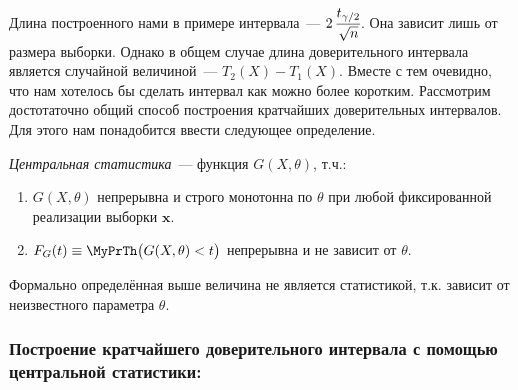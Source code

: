 Длина построенного нами в примере интервала~--- $2\, \cfrac{t_{\gamma / 2}}{\sqrt{n}}$.
Она зависит лишь от размера выборки.
Однако в общем случае длина доверительного интервала является случайной величиной~--- $T_2(X) - T_1(X)$.
Вместе с тем очевидно, что нам хотелось бы сделать интервал как можно более коротким.
Рассмотрим достотаточно общий способ построения кратчайших доверительных интервалов.
Для этого нам понадобится ввести следующее определение.

\begin{defn}
    \textit{Центральная статистика}~--- функция $G(X,\theta)$, т.ч.:
    \begin{enumerate}
        \item $G(X,\theta)$ непрерывна и строго монотонна по $\theta$ при любой фиксированной реализации выборки $\boldsymbol{x}$. 
        \item $F_G (t) \equiv \MyPrTh \bigl(G(X, \theta) < t\bigr)$ непрерывна и не зависит от $\theta$.
    \end{enumerate}
\end{defn}

\begin{rmrk}
    Формально определённая выше величина не является статистикой, т.к. зависит от неизвестного параметра $\theta$.
\end{rmrk}

\subsubsection{Построение кратчайшего доверительного интервала с помощью центральной статистики:}

